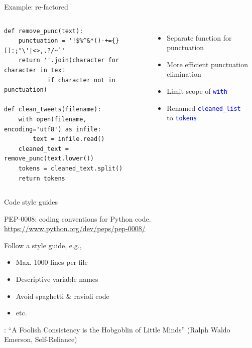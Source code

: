 \documentclass[aspectratio=169,usenames,dvipsnames]{beamer}
\begin{document}
\begin{frame}[fragile]{Example: re-factored}
\begin{columns}
\begin{lstlisting}
def remove_punc(text):
    punctuation = '!$%^&*()-+={}[]:;"\'|<>,.?/~`'
    return ''.join(character for character in text
            if character not in punctuation)

def clean_tweets(filename):
    with open(filename, encoding='utf8') as infile:
        text = infile.read()
    cleaned_text = remove_punc(text.lower())
    tokens = cleaned_text.split()
    return tokens
\end{lstlisting}
\begin{itemize}
\item Separate function for punctuation
\item More efficient punctuation elimination
\item Limit scope of \textcolor{blue}{\texttt{with}}
\item Renamed \textcolor{blue}{\texttt{cleaned\_list}} \\
    to \textcolor{blue}{\texttt{tokens}}
\end{itemize}
\end{columns}
\end{frame}

\begin{frame}{Code style guides}
    \begin{reference}
        PEP-0008: coding conventions for Python code.
        \url{https://www.python.org/dev/peps/pep-0008/}
    \end{reference}
    Follow a style guide, e.g.,
    \begin{itemize}
        \item Max. 1000 lines per file
        \item Descriptive variable names
        \item Avoid spaghetti \& ravioli code
        \item etc.
    \end{itemize}
    
    :
        ``A Foolish Consistency is the Hobgoblin of Little Minds''
        (Ralph Waldo Emerson, Self-Reliance)
\end{frame}
\end{document}
